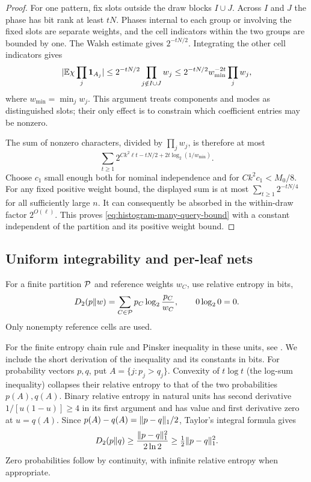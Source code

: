 \begin{proof}
For one pattern, fix slots outside the draw blocks $I\cup J$. Across
$I$ and $J$ the phase has bit rank at least $tN$. Phases internal to
each group or involving the fixed slots are separate weights, and the
cell indicators within the two groups are bounded by one. The Walsh
estimate gives $2^{-tN/2}$. Integrating the other cell indicators gives
\begin{equation}\label{eq:histogram-character-bound}
 \lvert \mathbb E\chi\prod_j\mathbf 1_{A_j}\rvert
 \le 2^{-tN/2}\prod_{j\notin I\cup J}w_j
 \le 2^{-tN/2}w_{\min}^{-2t}\prod_jw_j,
\end{equation}
where $w_{\min}=\min_jw_j$. This argument treats components and modes
as distinguished slots; their only effect is to constrain which
coefficient entries may be nonzero.

The sum of nonzero characters, divided by $\prod_jw_j$, is therefore
at most
\[
 \sum_{t\ge1}
 2^{Ck^2\ell t-tN/2+2t\log_2(1/w_{\min})}.
\]
Choose $c_1$ small enough both for nominal independence and for
$Ck^2c_1<M_0/8$. For any fixed positive weight bound, the displayed sum
is at most $\sum_{t\ge1}2^{-tN/4}$ for all sufficiently large $n$.
It can consequently be absorbed in the within-draw factor
$2^{O(\ell)}$. This proves \eqref{eq:histogram-many-query-bound} with a
constant independent of the partition and its positive weight bound.
\end{proof}

\subsection{Uniform integrability and per-leaf nets}

For a finite partition $\mathcal P$ and reference weights $w_C$, use relative
entropy in bits,
\[
 D_2(p\Vert w)=\sum_{C\in\mathcal P}p_C\log_2\frac{p_C}{w_C},
 \qquad 0\log_2 0=0.
\]
Only nonempty reference cells are used.

For the finite entropy chain rule and Pinsker inequality in these units,
see \citet[Theorem~2.5.3 and Lemma~11.6.1]{cover2006}. We include the
short derivation of the inequality and its constants in bits.
For probability vectors $p,q$, put $A=\{j:p_j>q_j\}$. Convexity of
$t\log t$ (the log-sum inequality) collapses their relative entropy
to that of the two probabilities $p(A),q(A)$. Binary relative entropy
in natural units has second derivative $1/[u(1-u)]\ge4$ in its first
argument and has value and first derivative zero at $u=q(A)$.
Since $p(A)-q(A)=\lVert p-q\rVert_1/2$, Taylor's integral formula gives
\begin{equation}\label{eq:histogram-pinsker}
 D_2(p\Vert q)\ge \frac{\lVert p-q\rVert_1^2}{2\ln2}
 \ge\tfrac12\lVert p-q\rVert_1^2.
\end{equation}
Zero probabilities follow by continuity, with infinite relative entropy
when appropriate.

